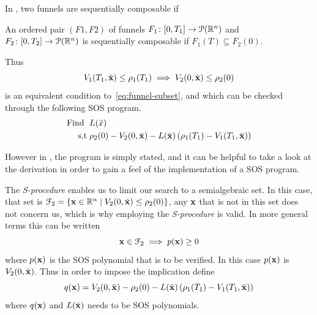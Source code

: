 In \cite[Majumdar and Tedrake, p.~47]{majumdarFunnelLibrariesRealtime2017}, two
funnels are sequentially composable if
\begin{definition}
  \label{def:funnel-composition}
  An ordered pair \((F1, F2)\) of funnels \(F_1 \colon [0,T_1] \rightarrow
  \mathcal{P}(\mathbb{R}^n)\) and \(F_2 \colon [0,T_2] \rightarrow \mathcal{P}(\mathbb{R}^n)\)
  is sequentially composable if \(F_1(T) \subseteq F_2(0)\).
\end{definition}

Thus
\[
  V_1(T_1,\bar{\mathbf{x}}) \leq \rho_1(T_1) \implies V_2(0,\bar{\mathbf{x}}) \leq
  \rho_2(0)
\]
is an equivalent condition to~\cref{eq:funnel-subset}, and which can be checked
through the following \ac{SOS} program.
\begin{align*}
  \text{Find } \; &L(\bar{x}) \\
  \text{s.t} \; &\rho_2(0) - V_2(0,\bar{\mathbf{x}}) - L(\bar{\mathbf{x}})
                  \left( \rho_1(T_1) - V_1(T_1,\bar{\mathbf{x}}) \right)
\end{align*}
\cite[Majumdar and Tedrake, p.~54]{majumdarFunnelLibrariesRealtime2017}

However in \cite[Majumdar and Tedrake]{majumdarFunnelLibrariesRealtime2017}, the
program is simply stated, and it can be helpful to take a look at the derivation
in order to gain a feel of the implementation of a \ac{SOS} program.

The \textit{S-procedure} enables us to limit our search to a semialgebraic set.
In this case, that set is \(\mathcal{F}_2 = \lbrace\mathbf{x} \in \mathbb{R}^n \mid
  V_2(0,\bar{\mathbf{x}}) \leq \rho_2(0)\rbrace\), any \(\mathbf{x}\) that is not in this
set does not concern us, which is why employing the \textit{S-procedure} is
valid. In more general terms this can be written
\[
  \mathbf{x} \in \mathcal{F}_2 \implies p(\mathbf{x}) \geq 0
\]
where \(p(\mathbf{x})\) is the \ac{SOS} polynomial that is to be verified. In this
case \(p(\mathbf{x})\) is \(V_2(0,\bar{\mathbf{x}})\). Thus in order to impose the
implication define
\[
  q(\mathbf{x}) = V_2(0,\bar{\mathbf{x}}) - \rho_2(0) - L(\bar{\mathbf{x}}) \left(
    \rho_1(T_1) - V_1(T_1,\bar{\mathbf{x}}) \right)
\]
where \(q(\mathbf{x})\) and \(L(\bar{\mathbf{x}})\) needs to be SOS polynomials.

